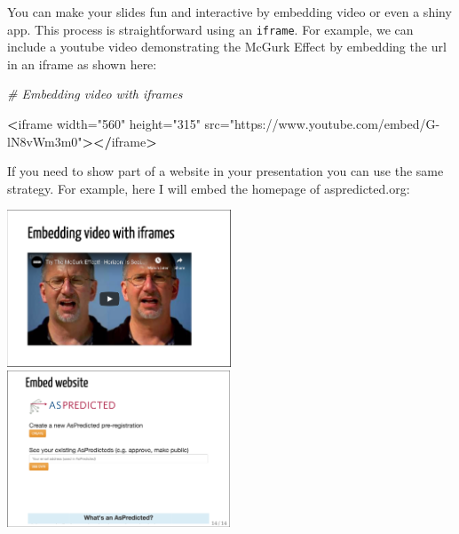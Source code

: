 \documentclass[
]{book}
\newenvironment{Shaded}{\begin{snugshade}}{\end{snugshade}}
\newcommand{\CommentTok}[1]{\textcolor[rgb]{0.37,0.37,0.37}{\textit{#1}}}
\newcommand{\ErrorTok}[1]{\textcolor[rgb]{0.14,0.14,0.14}{\textbf{#1}}}
\newcommand{\NormalTok}[1]{#1}
\newcommand{\OperatorTok}[1]{\textcolor[rgb]{0.43,0.43,0.43}{\textbf{#1}}}
\newcommand{\StringTok}[1]{\textcolor[rgb]{0.5,0.5,0.5}{#1}}
\begin{document}
You can make your slides fun and interactive by embedding video or even a shiny app. This process is straightforward using an \texttt{iframe}. For example, we can include a youtube video demonstrating the McGurk Effect by embedding the url in an iframe as shown here:

\begin{Shaded}
\begin{Highlighting}[]
\CommentTok{# Embedding video with iframes}

\OperatorTok{<}\NormalTok{iframe width=}\StringTok{"560"}\NormalTok{ height=}\StringTok{"315"} 
\NormalTok{src=}\StringTok{"https://www.youtube.com/embed/G-lN8vWm3m0"}\OperatorTok{>}\ErrorTok{</}\NormalTok{iframe}\OperatorTok{>}
\end{Highlighting}
\end{Shaded}

If you need to show part of a website in your presentation you can use the same strategy. For example, here I will embed the homepage of aspredicted.org:

\begin{Shaded}
\end{Shaded}

\includegraphics[width=0.5\textwidth,height=\textheight]{img/02_basics-embed-vido.png} \includegraphics[width=0.4975\textwidth,height=\textheight]{img/02_basics-embed-website.png}
\end{document}
